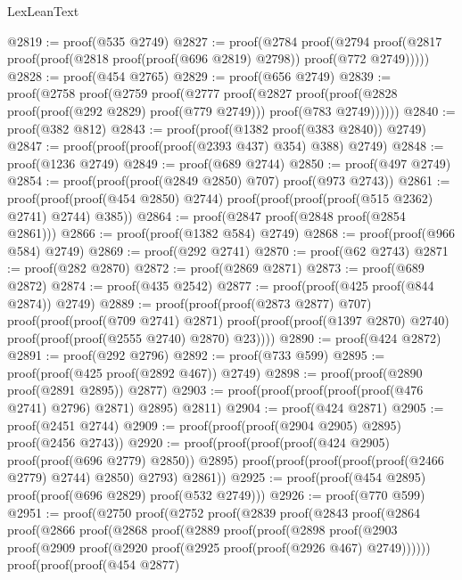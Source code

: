 \begin{lexlean}{LexLeanText}
\begin{coremodule}
@2819 := proof(@535 @2749)
@2827 := proof(@2784
      proof(@2794
          proof(@2817 proof(proof(@2818 proof(proof(@696 @2819) @2798)) proof(@772 @2749)))))
@2828 := proof(@454 @2765)
@2829 := proof(@656 @2749)
@2839 := proof(@2758
      proof(@2759
          proof(@2777
              proof(@2827
                  proof(proof(@2828 proof(proof(@292 @2829) proof(@779 @2749)))
                      proof(@783 @2749))))))
@2840 := proof(@382 @812)
@2843 := proof(proof(@1382 proof(@383 @2840)) @2749)
@2847 := proof(proof(proof(proof(@2393 @437) @354) @388) @2749)
@2848 := proof(@1236 @2749)
@2849 := proof(@689 @2744)
@2850 := proof(@497 @2749)
@2854 := proof(proof(proof(@2849 @2850) @707) proof(@973 @2743))
@2861 := proof(proof(proof(@454 @2850) @2744)
      proof(proof(proof(proof(@515 @2362) @2741) @2744) @385))
@2864 := proof(@2847 proof(@2848 proof(@2854 @2861)))
@2866 := proof(proof(@1382 @584) @2749)
@2868 := proof(proof(@966 @584) @2749)
@2869 := proof(@292 @2741)
@2870 := proof(@62 @2743)
@2871 := proof(@282 @2870)
@2872 := proof(@2869 @2871)
@2873 := proof(@689 @2872)
@2874 := proof(@435 @2542)
@2877 := proof(proof(@425 proof(@844 @2874)) @2749)
@2889 := proof(proof(proof(@2873 @2877) @707)
      proof(proof(proof(@709 @2741) @2871)
          proof(proof(proof(@1397 @2870) @2740) proof(proof(proof(@2555 @2740) @2870) @23))))
@2890 := proof(@424 @2872)
@2891 := proof(@292 @2796)
@2892 := proof(@733 @599)
@2895 := proof(proof(@425 proof(@2892 @467)) @2749)
@2898 := proof(proof(@2890 proof(@2891 @2895)) @2877)
@2903 := proof(proof(proof(proof(proof(@476 @2741) @2796) @2871) @2895) @2811)
@2904 := proof(@424 @2871)
@2905 := proof(@2451 @2744)
@2909 := proof(proof(proof(@2904 @2905) @2895) proof(@2456 @2743))
@2920 := proof(proof(proof(proof(@424 @2905) proof(proof(@696 @2779) @2850)) @2895)
      proof(proof(proof(proof(proof(@2466 @2779) @2744) @2850) @2793) @2861))
@2925 := proof(proof(@454 @2895) proof(proof(@696 @2829) proof(@532 @2749)))
@2926 := proof(@770 @599)
@2951 := proof(@2750
      proof(@2752
          proof(@2839
              proof(@2843
                  proof(@2864
                      proof(@2866
                          proof(@2868
                              proof(@2889
                                  proof(proof(@2898
                                        proof(@2903
                                            proof(@2909
                                                proof(@2920
                                                    proof(@2925 proof(proof(@2926 @467) @2749))))))
                                      proof(proof(proof(@454 @2877)

\end{coremodule}
\end{lexlean}
